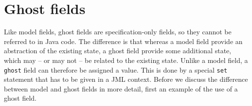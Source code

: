 \documentclass{llncs}
\begin{document}

% 



\section{Ghost fields}
\label{Sec:ghost}


Like model fields, ghost fields are specification-only fields,
so they cannot be referred to in Java code.
The difference is that whereas a model field provide an abstraction
of the existing state, a ghost field provide some additional state,
which may -- or may not -- be related to the existing state.
Unlike a model field, a \texttt{ghost} field can therefore
be assigned a value. This is done by a special \texttt{set} statement
that has to be given in a JML context.
Before we discuss the difference between model and ghost fields
in more detail, first an example of the use of a ghost field.
\end{document}
